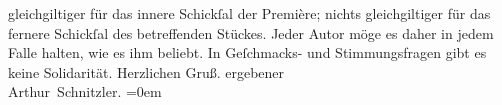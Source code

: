                gleichgiltiger für das innere Schickſal der Première; nichts gleichgiltiger für das
               fernere Schickſal des betreffenden Stückes. Jeder Autor möge es daher in jedem Falle
               halten, wie es ihm beliebt. In Geſchmacks- und Stimmungsfragen gibt es keine
               Solidarität.\pend
           \pstart
           Herzlichen Gruß. \label{K_L00890_2v}\label{K_L00890_2h} ergebener{\\[\baselineskip]}\spacefill\mbox{Arthur Schnitzler.}\pend
           \leftskip=0em{}\endnumbering{}  
      